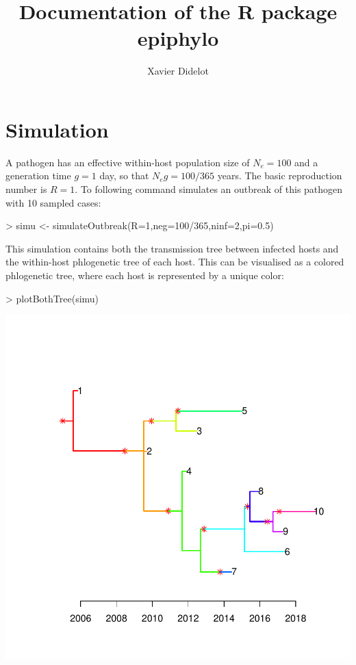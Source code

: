 \documentclass[a4paper]{article}
\title{Documentation of the R package epiphylo}
\author{Xavier Didelot}
\begin{document}


\maketitle


\section{Simulation}

A pathogen has an effective within-host population size of $N_e=100$ and a generation time $g=1$ day, so that $N_e g=100/365$ years. The basic reproduction number is $R=1$. To following command simulates an outbreak of this pathogen with 10 sampled cases: 
\begin{Schunk}
\begin{Sinput}
> simu <- simulateOutbreak(R=1,neg=100/365,ninf=2,pi=0.5)
\end{Sinput}
\end{Schunk}

This simulation contains both the transmission tree between infected hosts and the within-host phlogenetic tree of each host. This can be visualised as a colored phlogenetic tree, where each host is represented by a unique color:

\begin{center}
\begin{Schunk}
\begin{Sinput}
> plotBothTree(simu)
\end{Sinput}
\end{Schunk}
\includegraphics{epiphylo-003}
\end{center}
\end{document}
